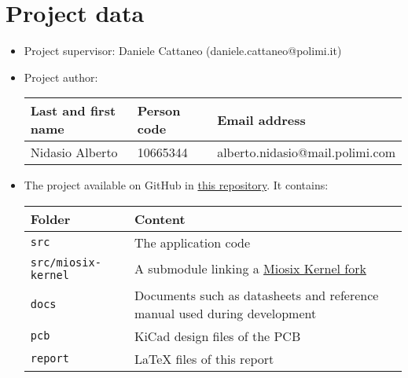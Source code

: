 \section{Project data}

\begin{itemize}
    \item Project supervisor: Daniele Cattaneo (daniele.cattaneo@polimi.it)
    \item Project author:
          \begin{center}
              \begin{tabular}{lll}
                  Last and first name & Person code & Email address                   \\
                  \hline
                  Nidasio Alberto     & 10665344    & alberto.nidasio@mail.polimi.com \\
              \end{tabular}
          \end{center}
    \item The project available on GitHub in \href{https://github.com/NidasioAlberto/signal-generator}{this repository}. It contains:
          \begin{center}
              \begin{tabular}{ll}
                  Folder                     & Content                                                                                          \\
                  \hline
                  \texttt{src}               & The application code                                                                             \\
                  \texttt{src/miosix-kernel} & A submodule linking a \href{https://github.com/NidasioAlberto/miosix-kernel}{Miosix Kernel fork} \\
                  \texttt{docs}              & Documents such as datasheets and reference manual used during development                        \\
                  \texttt{pcb}               & KiCad design files of the PCB                                                                    \\
                  \texttt{report}            & LaTeX files of this report
              \end{tabular}
          \end{center}
\end{itemize}
